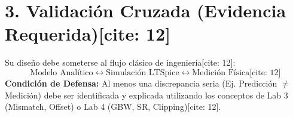 \documentclass[11pt, a4paper]{article}
\begin{document}
\section*{3. Validación Cruzada (Evidencia Requerida)[cite: 12]}
Su diseño debe someterse al flujo clásico de ingeniería[cite: 12]:
\begin{equation*}
    \boxed{\text{Modelo Analítico}} \leftrightarrow \boxed{\text{Simulación LTSpice}} \leftrightarrow \boxed{\text{Medición Física}} \text{[cite: 12]}
\end{equation*}
\textbf{Condición de Defensa:} Al menos una discrepancia seria (Ej. Predicción $\neq$ Medición) debe ser identificada y explicada utilizando los conceptos de Lab 3 (Mismatch, Offset) o Lab 4 (GBW, SR, Clipping)[cite: 12].
\end{document}
